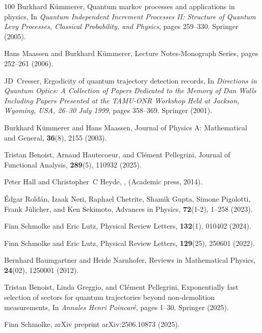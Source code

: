 \documentclass[preprint,pteplogo]{ptephy_v2}%
\numberwithin{equation}{section}
\theoremstyle{definition}
\begin{document}
\begin{thebibliography}{100}
Burkhard K{\"u}mmerer,
\newblock Quantum markov processes and applications in physics,
\newblock In {\em Quantum Independent Increment Processes II: Structure of Quantum Levy Processes, Classical Probability, and Physics}, pages 259--330. Springer (2005).

Hans Maassen and Burkhard K{\"u}mmerer, Lecture Notes-Monograph Series, pages 252--261 (2006).

JD~Cresser,
\newblock Ergodicity of quantum trajectory detection records,
\newblock In {\em Directions in Quantum Optics: A Collection of Papers Dedicated to the Memory of Dan Walls Including Papers Presented at the TAMU-ONR Workshop Held at Jackson, Wyoming, USA, 26--30 July 1999}, pages 358--369. Springer (2001).

Burkhard K{\"u}mmerer and Hans Maassen, Journal of Physics A: Mathematical and General, {\bf 36}(8), 2155 (2003).

Tristan Benoist, Arnaud Hautecoeur, and Cl{\'e}ment Pellegrini, Journal of Functional Analysis, {\bf 289}(5), 110932 (2025).

Peter Hall and Christopher~C Heyde,
,
\newblock  (Academic press, 2014).

{\'E}dgar Rold{\'a}n, Izaak Neri, Raphael Chetrite, Shamik Gupta, Simone Pigolotti, Frank J{\"u}licher, and Ken Sekimoto, Advances in Physics, {\bf 72}(1-2), 1--258 (2023).

Finn Schmolke and Eric Lutz, Physical Review Letters, {\bf 132}(1), 010402 (2024).

Finn Schmolke and Eric Lutz, Physical Review Letters, {\bf 129}(25), 250601 (2022).

Bernhard Baumgartner and Heide Narnhofer, Reviews in Mathematical Physics, {\bf 24}(02), 1250001 (2012).

Tristan Benoist, Linda Greggio, and Cl{\'e}ment Pellegrini,
\newblock Exponentially fast selection of sectors for quantum trajectories beyond non-demolition measurements,
\newblock In {\em Annales Henri Poincar{\'e}}, pages 1--30. Springer (2025).

Finn Schmolke, arXiv preprint arXiv:2506.10873 (2025).


\end{thebibliography}
\end{document}
